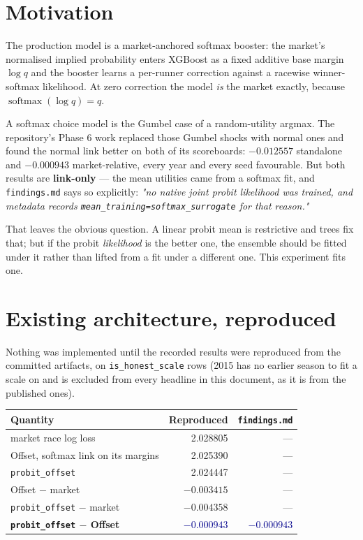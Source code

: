 \documentclass[11pt,a4paper]{article}
\newcommand{\good}[1]{\textcolor{darkblue}{\textbf{#1}}}
\begin{document}
\section{Motivation}

The production model is a market-anchored softmax booster: the market's normalised implied
probability enters XGBoost as a fixed additive base margin $\log q$ and the booster learns a
per-runner correction against a racewise winner-softmax likelihood. At zero correction the
model \emph{is} the market exactly, because $\operatorname{softmax}(\log q) = q$.

A softmax choice model is the Gumbel case of a random-utility argmax. The repository's Phase 6
work replaced those Gumbel shocks with normal ones and found the normal link better on both of
its scoreboards: $-0.012557$ standalone and $-0.000943$ market-relative, every year and every
seed favourable. But both results are \textbf{link-only} --- the mean utilities came from a
softmax fit, and \texttt{findings.md} says so explicitly: \emph{"no native joint probit
likelihood was trained, and metadata records \texttt{mean\_training=softmax\_surrogate} for
that reason."}

That leaves the obvious question. A linear probit mean is restrictive and trees fix that; but
if the probit \emph{likelihood} is the better one, the ensemble should be fitted under it
rather than lifted from a fit under a different one. This experiment fits one.

\section{Existing architecture, reproduced}

Nothing was implemented until the recorded results were reproduced from the committed
artifacts, on \texttt{is\_honest\_scale} rows (2015 has no earlier season to fit a scale on and
is excluded from every headline in this document, as it is from the published ones).

\begin{center}\small
\begin{tabular}{lrr}
\toprule
Quantity & Reproduced & \texttt{findings.md} \\
\midrule
market race log loss & 2.028805 & --- \\
Offset, softmax link on its margins & 2.025390 & --- \\
\texttt{probit\_offset} & 2.024447 & --- \\
Offset $-$ market & $-0.003415$ & --- \\
\texttt{probit\_offset} $-$ market & $-0.004358$ & --- \\
\rowcolor{rowshade}\textbf{\texttt{probit\_offset} $-$ Offset} & \good{$-0.000943$} & \good{$-0.000943$} \\
\bottomrule
\end{tabular}
\end{center}
\end{document}
